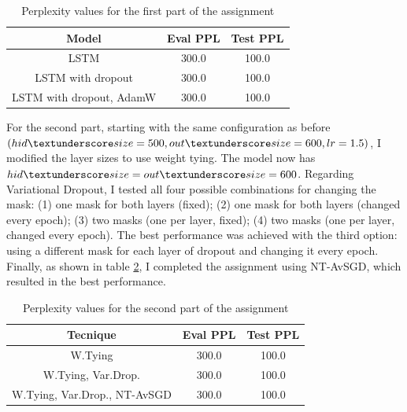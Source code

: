 \documentclass[a4paper]{article}
\begin{document}
\begin{table}[h]
  \centering
  \begin{tabular}{|c|c|c|}
    \hline
    \textbf{Model} & \textbf{Eval PPL} & \textbf{Test PPL} \\
    \hline
    LSTM & 300.0 & 100.0 \\
    LSTM with dropout & 300.0 & 100.0 \\
    LSTM with dropout, AdamW & 300.0 & 100.0 \\
    \hline
  \end{tabular}
  \caption{Perplexity values for the first part of the assignment}
  \label{tab:results1}

\end{table}


For the second part, starting with the same configuration as before \((hid \textunderscore size=500, out \textunderscore size=600, lr=1.5)\), I modified the layer sizes to use weight tying.
The model now has \(hid \textunderscore size=out \textunderscore size=600\).
Regarding Variational Dropout, I tested all four possible combinations for changing the mask: (1) one mask for both layers (fixed); (2) one mask for both layers (changed every epoch); (3) two masks (one per layer, fixed); (4) two masks (one per layer, changed every epoch). The best performance was achieved with the third option: using a different mask for each layer of dropout and changing it every epoch.
Finally, as shown in table \ref{tab:results2}, I completed the assignment using NT-AvSGD, which resulted in the best performance.

\begin{table}[h]
  \centering
  \begin{tabular}{|c|c|c|}
    \hline
    \textbf{Tecnique} & \textbf{Eval PPL} & \textbf{Test PPL} \\
    \hline
    W.Tying & 300.0 & 100.0 \\
    W.Tying, Var.Drop. & 300.0 & 100.0 \\
    W.Tying, Var.Drop., NT-AvSGD & 300.0 & 100.0 \\
    \hline
  \end{tabular}
  \caption{Perplexity values for the second part of the assignment}
  \label{tab:results2}

\end{table}
\end{document}
